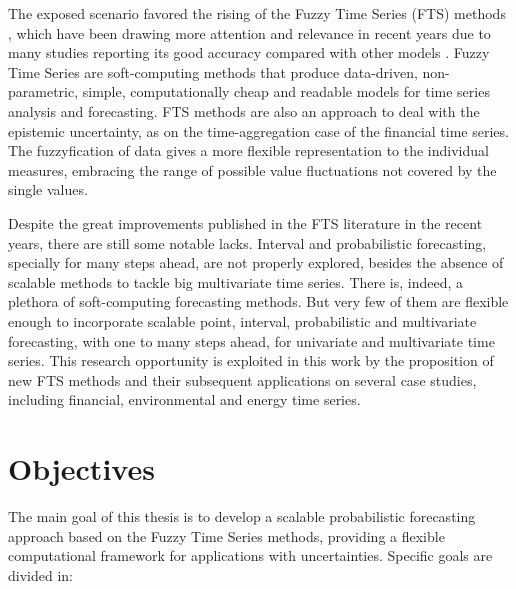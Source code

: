 The exposed scenario favored the rising of the Fuzzy Time Series (FTS) methods \cite{song1993fuzzy}, which have been drawing more  attention and relevance in recent years due to many studies reporting its good accuracy compared with other models \cite{Singh2008}. Fuzzy Time Series are soft-computing methods that produce data-driven, non-parametric, simple, computationally cheap and readable models for time series analysis and forecasting. FTS methods are also an approach to deal with  the  epistemic uncertainty, as on the time-aggregation case of the financial time series. The fuzzyfication of data gives a more flexible representation to the individual measures, embracing the range of possible value fluctuations not covered by the single values. 

Despite the great improvements published in the FTS literature in the recent years, there are still some notable lacks. Interval and probabilistic forecasting, specially for many steps ahead, are not properly explored, besides the absence of scalable methods to tackle big multivariate time series. There is, indeed, a plethora of soft-computing forecasting methods. But very few of them are flexible enough to incorporate scalable point, interval, probabilistic and multivariate forecasting, with one to many steps ahead, for univariate and multivariate time series. This research opportunity is exploited in this work by the proposition of new FTS methods and their subsequent applications on several case studies, including financial, environmental and energy time series. 

\section{Objectives}  


The main goal of this thesis is to develop a scalable probabilistic forecasting approach based on the Fuzzy Time Series methods, providing a flexible computational framework for applications with uncertainties. Specific goals are divided in:

